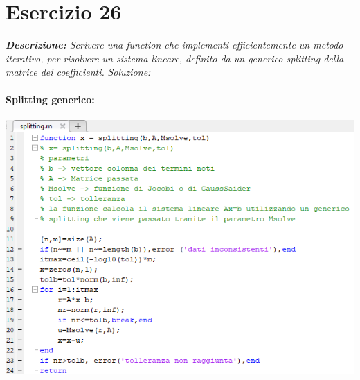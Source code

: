 \section{Esercizio 26}
\textit{\textbf{Descrizione:}  Scrivere una function che implementi efficientemente un metodo iterativo, per risolvere un sistema lineare, definito da un generico splitting della matrice dei coefficienti.}\newline
\emph{Soluzione: }\\~\\
\textbf{Splitting generico:}
\\~\\
\includegraphics[width=1.3\linewidth]{img/splitting} \newpage